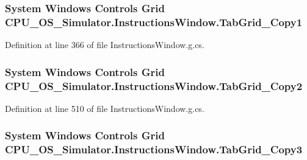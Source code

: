 \subsubsection[{Tab\+Grid\+\_\+\+Copy1}]{\setlength{\rightskip}{0pt plus 5cm}System Windows Controls Grid C\+P\+U\+\_\+\+O\+S\+\_\+\+Simulator.\+Instructions\+Window.\+Tab\+Grid\+\_\+\+Copy1\hspace{0.3cm}{\ttfamily [package]}}\label{class_c_p_u___o_s___simulator_1_1_instructions_window_a834965d0ae6a57edb71a818dca188a30}


Definition at line 366 of file Instructions\+Window.\+g.\+cs.

\hypertarget{class_c_p_u___o_s___simulator_1_1_instructions_window_ac4b83982bf62dc5c0484ac2729167ba4}{}
\subsubsection[{Tab\+Grid\+\_\+\+Copy2}]{\setlength{\rightskip}{0pt plus 5cm}System Windows Controls Grid C\+P\+U\+\_\+\+O\+S\+\_\+\+Simulator.\+Instructions\+Window.\+Tab\+Grid\+\_\+\+Copy2\hspace{0.3cm}{\ttfamily [package]}}\label{class_c_p_u___o_s___simulator_1_1_instructions_window_ac4b83982bf62dc5c0484ac2729167ba4}


Definition at line 510 of file Instructions\+Window.\+g.\+cs.

\hypertarget{class_c_p_u___o_s___simulator_1_1_instructions_window_a8a50487f6e6acca8a58ffe218e32abe2}{}
\subsubsection[{Tab\+Grid\+\_\+\+Copy3}]{\setlength{\rightskip}{0pt plus 5cm}System Windows Controls Grid C\+P\+U\+\_\+\+O\+S\+\_\+\+Simulator.\+Instructions\+Window.\+Tab\+Grid\+\_\+\+Copy3\hspace{0.3cm}{\ttfamily [package]}}\label{class_c_p_u___o_s___simulator_1_1_instructions_window_a8a50487f6e6acca8a58ffe218e32abe2}



